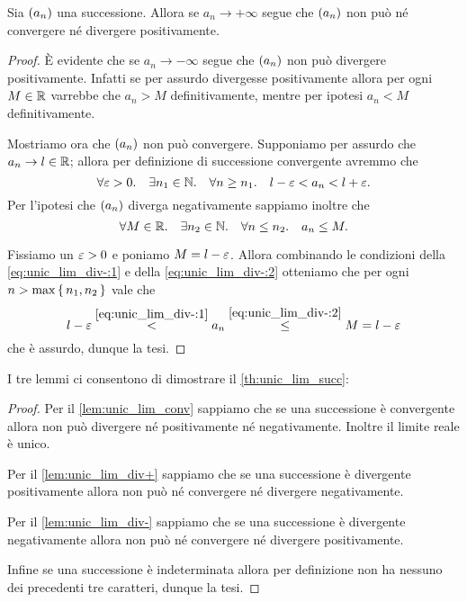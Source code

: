 \begin{lemma} \label{lem:unic_lim_div-}
    Sia $\seqn*{a}$ una successione. Allora se $a_n \to +\infty$ segue che $\seqn*{a}$ non può né convergere né divergere positivamente.
\end{lemma}
\begin{proof}
    È evidente che se $a_n \to -\infty$ segue che $\seqn*{a}$ non può divergere positivamente. Infatti se per assurdo divergesse positivamente allora per ogni $M \in \mathbb{R}$ varrebbe che $a_n > M$ definitivamente, mentre per ipotesi $a_n < M$ definitivamente.

    Mostriamo ora che $\seqn*{a}$ non può convergere. Supponiamo per assurdo che $a_n \to l \in \mathbb{R}$; allora per definizione di successione convergente avremmo che \begin{equation}
        \forall \varepsilon > 0. \quad \exists n_1 \in \mathbb{N}. \quad \forall n \geq n_1. \quad l - \varepsilon < a_n < l + \varepsilon. \label{eq:unic_lim_div-:1}\\
    \end{equation}
    Per l'ipotesi che $\seqn*{a}$ diverga negativamente sappiamo inoltre che \begin{equation}
        \forall M \in \mathbb{R}. \quad \exists n_2 \in \mathbb{N}. \quad \forall n \leq n_2. \quad a_n \leq M. \label{eq:unic_lim_div-:2}
    \end{equation}

    Fissiamo un $\varepsilon > 0$ e poniamo $M = l - \varepsilon$. Allora combinando le condizioni della \eqref{eq:unic_lim_div-:1} e della \eqref{eq:unic_lim_div-:2} otteniamo che per ogni $n > \max \left\{\,n_1, n_2\,\right\}$ vale che \[
        l - \varepsilon \stackrel{\eqref{eq:unic_lim_div-:1}}{<} a_n \stackrel{\eqref{eq:unic_lim_div-:2}}{\leq} M = l - \varepsilon   
    \] che è assurdo, dunque la tesi.
\end{proof}

I tre lemmi ci consentono di dimostrare il \autoref{th:unic_lim_succ}:
\begin{proof}
    Per il \autoref{lem:unic_lim_conv} sappiamo che se una successione è convergente allora non può divergere né positivamente né negativamente. Inoltre il limite reale è unico.

    Per il \autoref{lem:unic_lim_div+} sappiamo che se una successione è divergente positivamente allora non può né convergere né divergere negativamente.

    Per il \autoref{lem:unic_lim_div-} sappiamo che se una successione è divergente negativamente allora non può né convergere né divergere positivamente.

    Infine se una successione è indeterminata allora per definizione non ha nessuno dei precedenti tre caratteri, dunque la tesi.
\end{proof}

